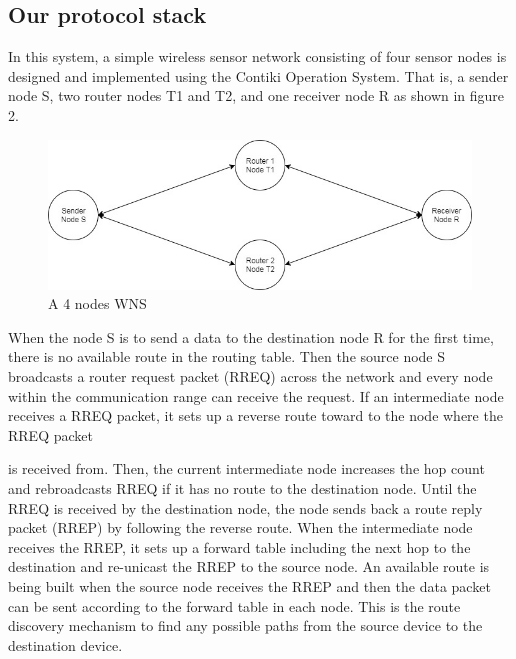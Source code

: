 \documentclass[a4paper]{article}
\begin{document}
\subsection{Our protocol stack}
In this system, a simple wireless sensor network consisting of four sensor nodes is designed and implemented using the Contiki Operation System. That is, a sender node S, two router nodes T1 and T2, and one receiver node R as shown in figure 2.

\begin{figure}[!htb] 
  \centering
  \includegraphics[scale=0.6]{protocolstack2}
  \begin{center}
  	\caption{A 4 nodes WNS}
  \end{center} 
  \label{fig:protostack2} 
\end{figure}

When the node S is to send a data to the destination node R for the first time, there is no available route in the routing table. Then the source node S broadcasts a router request packet (RREQ) across the network and every node within the communication range can receive the request. If an intermediate node receives a RREQ packet, it sets up a reverse route toward to the node where the RREQ packet

is received from. Then, the current intermediate node increases the hop count and rebroadcasts RREQ if it has no route to the destination node. Until the RREQ is received by the destination node, the node sends back a route reply packet (RREP) by following the reverse route. When the intermediate node receives the RREP, it sets up a forward table including the next hop to the destination and re-unicast the RREP to the source node. An available route is being built when the source node receives the RREP and then the data packet can be sent according to the forward table in each node. This is the route discovery mechanism to find any possible paths from the source device to the destination device.  
\end{document}
